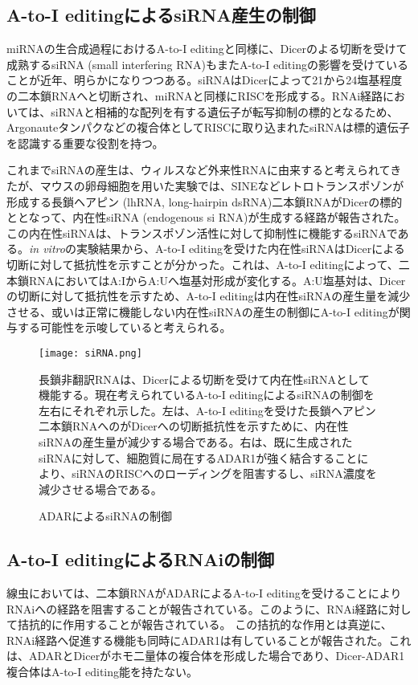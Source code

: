 \subsection{A-to-I editingによるsiRNA産生の制御}
miRNAの生合成過程におけるA-to-I editingと同様に、Dicerのよる切断を受けて成熟するsiRNA (small interfering RNA)もまたA-to-I editingの影響を受けていることが近年、明らかになりつつある。siRNAはDicerによって21から24塩基程度の二本鎖RNAへと切断され、miRNAと同様にRISCを形成する。RNAi経路においては、siRNAと相補的な配列を有する遺伝子が転写抑制の標的となるため、Argonauteタンパクなどの複合体としてRISCに取り込まれたsiRNAは標的遺伝子を認識する重要な役割を持つ。
\par
これまでsiRNAの産生は、ウィルスなど外来性RNAに由来すると考えられてきたが、マウスの卵母細胞を用いた実験では、SINEなどレトロトランスポゾンが形成する長鎖ヘアピン (lhRNA, long-hairpin dsRNA)二本鎖RNAがDicerの標的ととなって、内在性siRNA (endogenous si RNA)が生成する経路が報告された。この内在性siRNAは、トランスポゾン活性に対して抑制性に機能するsiRNAである。\textit{in vitro}の実験結果から、A-to-I editingを受けた内在性siRNAはDicerによる切断に対して抵抗性を示すことが分かった。これは、A-to-I editingによって、二本鎖RNAにおいてはA:IからA:Uへ塩基対形成が変化する。A:U塩基対は、Dicerの切断に対して抵抗性を示すため、A-to-I editingは内在性siRNAの産生量を減少させる、或いは正常に機能しない内在性siRNAの産生の制御にA-to-I editingが関与する可能性を示唆していると考えられる。

\begin{figure}[!htbp]
	\begin{center}
		\texttt{[image: siRNA.png]}
	\end{center}
	\caption{ADARによるsiRNAの制御}
	\begin{flushleft}
		\small{長鎖非翻訳RNAは、Dicerによる切断を受けて内在性siRNAとして機能する。現在考えられているA-to-I editingによるsiRNAの制御を左右にそれぞれ示した。左は、A-to-I editingを受けた長鎖ヘアピン二本鎖RNAへのがDicerへの切断抵抗性を示すために、内在性siRNAの産生量が減少する場合である。右は、既に生成されたsiRNAに対して、細胞質に局在するADAR1が強く結合することにより、siRNAのRISCへのローディングを阻害するし、siRNA濃度を減少させる場合である。}
	\end{flushleft}
	\label{fig:adar_siRNA}
\end{figure}

\subsection{A-to-I editingによるRNAiの制御}
線虫においては、二本鎖RNAがADARによるA-to-I editingを受けることによりRNAiへの経路を阻害することが報告されている。このように、RNAi経路に対して拮抗的に作用することが報告されている。
この拮抗的な作用とは真逆に、RNAi経路へ促進する機能も同時にADAR1は有していることが報告された。これは、ADARとDicerがホモ二量体の複合体を形成した場合であり、Dicer-ADAR1複合体はA-to-I editing能を持たない。

